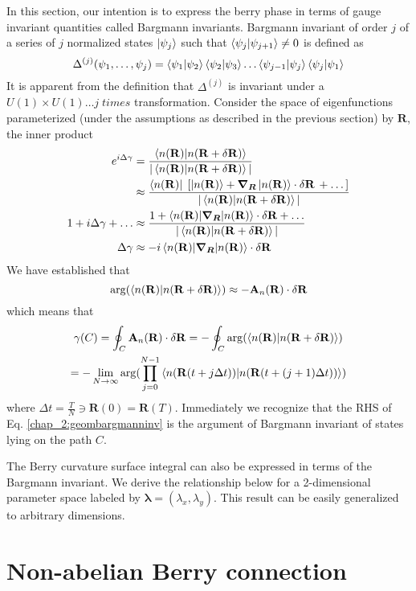 In this section, our intention is to express the berry phase in terms of gauge invariant quantities called Bargmann invariants. 
Bargmann invariant of order $j$ of a series of $j$ normalized states $\ket{\psi_j}$ such that $\braket{\psi_j|\psi_{j+1}} \neq 0$ is defined as 
\begin{equation}
 \Delta^{(j)}(\psi_1, \dots, \psi_j) = \braket{\psi_1 | \psi_2}\braket{\psi_2|\psi_3}\dots\braket{\psi_{j-1}|\psi_j}\braket{\psi_j|\psi_1}
\end{equation} It is apparent from the definition that $\Delta^{(j)}$ is invariant under a $U(1) \times U(1) \dots j\;times$ transformation.
Consider the space of eigenfunctions parameterized (under the assumptions as 
described in the previous section) by $\mathbf{R}$, the inner product 
\begin{align}
e^{i\Delta\gamma} &= \frac{\braket{n(\mathbf{R})|n(\mathbf{R} +\delta\mathbf{R})}}{|\braket{n(\mathbf{R})|n(\mathbf{R} +\delta\mathbf{R})}|} \\
 		  &\approx \frac{\bra{n(\mathbf{R})}\;\lbrack \ket{n(\mathbf{R})} + \bm{\nabla_R}\ket{n(\mathbf{R})}\cdot \delta\mathbf{R}\, + \dots \rbrack}{|\braket{n(\mathbf{R})|n(\mathbf{R} +\delta\mathbf{R})}|} \nonumber \\
1 + i\Delta\gamma + \dots &\approx \frac{1 + \braket{n(\mathbf{R})|\bm{\nabla_R}|n(\mathbf{R})}\cdot \delta\mathbf{R} + \dots}{|\braket{n(\mathbf{R})|n(\mathbf{R} +\delta\mathbf{R})}|} \nonumber \\
\Delta\gamma	   &\approx  -i\braket{n(\mathbf{R})|\bm{\nabla_R}|n(\mathbf{R})}\cdot \delta\mathbf{R}
\end{align}
We have established that 
\begin{equation*}
 \arg(\braket{n(\mathbf{R})|n(\mathbf{R} +\delta\mathbf{R})}) \approx -\mathbf{A}_{n}(\mathbf{R}) \cdot \delta\mathbf{R}
\end{equation*} which means that
\begin{multline}
 \label{chap_2:geombargmanninv}\gamma(C) = \oint_{C}{\mathbf{A}_{n}(\mathbf{R}) \cdot \delta\mathbf{R}}  = -\oint_{C}{\arg(\braket{n(\mathbf{R})|n(\mathbf{R} +\delta\mathbf{R})})} \\ = -\lim_{N\rightarrow\infty} \arg(\prod_{j=0}^{N-1}{\braket{n(\mathbf{R}(t + j\Delta t))|n(\mathbf{R}(t + (j+1)\Delta t))}})
\end{multline} where $\Delta t = \frac{T}{N} \ni \mathbf{R}(0)=\mathbf{R}(T)$.
Immediately we recognize that the RHS of Eq. \eqref{chap_2:geombargmanninv} is the argument of Bargmann invariant of states lying on the path $C$.

The Berry curvature surface integral can also be expressed in terms of the Bargmann invariant. We derive the relationship below for a 2-dimensional parameter space
labeled by $\bm{\lambda} = (\lambda_x, \lambda_y)$. This result can be easily generalized to arbitrary dimensions.

\section{Non-abelian Berry connection}